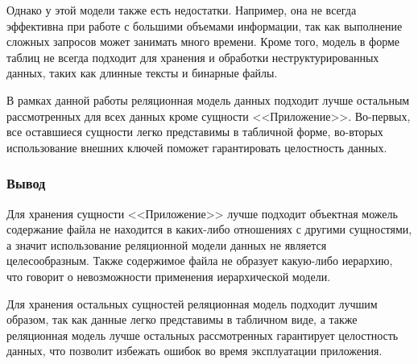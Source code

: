 Однако у этой модели также есть недостатки. Например, она не всегда эффективна при работе с большими объемами информации, так как выполнение сложных запросов может занимать много времени. Кроме того, модель в форме таблиц не всегда подходит для хранения и обработки неструктурированных данных, таких как длинные тексты и бинарные файлы.

В рамках данной работы реляционная модель данных подходит лучше остальным рассмотренных для всех данных кроме сущности <<Приложение>>. Во-первых, все оставшиеся сущности легко представимы в табличной форме, во-вторых использование внешних ключей поможет гарантировать целостность данных.

\subsubsection{Вывод}

Для хранения сущности <<Приложение>> лучше подходит объектная можель содержание файла не находится в каких-либо отношениях с другими сущностями, а значит использование реляционной модели данных не является целесообразным. Также содержимое файла не образует какую-либо иерархию, что говорит о невозможности применения иерархической модели.

Для хранения остальных сущностей реляционная модель подходит лучшим образом, так как данные легко представимы в табличном виде, а также реляционная модель лучше остальных рассмотренных гарантирует целостность данных, что позволит избежать ошибок во время эксплуатации приложения.

\pagebreak
